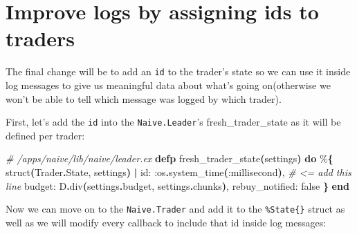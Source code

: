\documentclass[
  oneside]{book}
\newenvironment{Shaded}{\begin{snugshade}}{\end{snugshade}}
\newcommand{\CommentTok}[1]{\textcolor[rgb]{0.56,0.35,0.01}{\textit{#1}}}
\newcommand{\ConstantTok}[1]{\textcolor[rgb]{0.56,0.35,0.01}{#1}}
\newcommand{\FunctionTok}[1]{\textcolor[rgb]{0.13,0.29,0.53}{\textbf{#1}}}
\newcommand{\KeywordTok}[1]{\textcolor[rgb]{0.13,0.29,0.53}{\textbf{#1}}}
\newcommand{\NormalTok}[1]{#1}
\newcommand{\OperatorTok}[1]{\textcolor[rgb]{0.81,0.36,0.00}{\textbf{#1}}}
\newcommand{\VariableTok}[1]{\textcolor[rgb]{0.00,0.00,0.00}{#1}}
\begin{document}
\section{Improve logs by assigning ids to traders}\label{improve-logs-by-assigning-ids-to-traders}

The final change will be to add an \texttt{id} to the trader's state so we can use it inside log messages to give us meaningful data about what's going on(otherwise we won't be able to tell which message was logged by which trader).

First, let's add the \texttt{id} into the \texttt{Naive.Leader}'s fresh\_trader\_state as it will be defined per trader:

\begin{Shaded}
\begin{Highlighting}[]
  \CommentTok{\# /apps/naive/lib/naive/leader.ex}
  \KeywordTok{defp}\NormalTok{ fresh\_trader\_state}\FunctionTok{(}\NormalTok{settings}\FunctionTok{)} \KeywordTok{do}
\NormalTok{    \%}\FunctionTok{\{}
\NormalTok{      struct}\FunctionTok{(}\ConstantTok{Trader}\OperatorTok{.}\ConstantTok{State}\NormalTok{, settings}\FunctionTok{)}
      \OperatorTok{|} \VariableTok{id:} \VariableTok{:os}\OperatorTok{.}\NormalTok{system\_time}\FunctionTok{(}\VariableTok{:millisecond}\FunctionTok{)}\NormalTok{, }\CommentTok{\# \textless{}= add this line}
        \VariableTok{budget:}\NormalTok{ D}\OperatorTok{.}\NormalTok{div}\FunctionTok{(}\NormalTok{settings}\OperatorTok{.}\NormalTok{budget, settings}\OperatorTok{.}\NormalTok{chunks}\FunctionTok{)}\NormalTok{,}
        \VariableTok{rebuy\_notified:} \ConstantTok{false}
    \FunctionTok{\}}
  \KeywordTok{end}
\end{Highlighting}
\end{Shaded}

Now we can move on to the \texttt{Naive.Trader} and add it to the \texttt{\%State\{\}} struct as well as we will modify every callback to include that id inside log messages:
\end{document}
